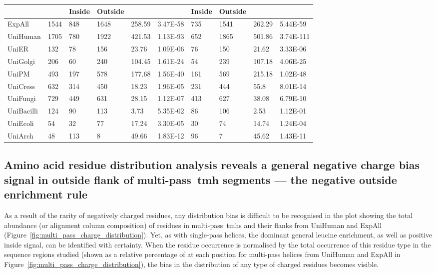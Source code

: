 \begin{table}[htbp!]
{\begin{tabular}{p{5em}lllllllll}
 \cmidrule{3-4}\cmidrule{7-8}    \multicolumn{1}{c}{} &       & \multicolumn{1}{p{5em}}{\textbf{Inside}} & \multicolumn{1}{p{5em}}{\textbf{Outside}} &       &       & \multicolumn{1}{p{5em}}{\textbf{Inside}} & \multicolumn{1}{p{5em}}{\textbf{Outside}} &       &  \\
     \midrule
     ExpAll & 1544  & 848   & 1648  & 258.59 & 3.47E-58 & 735   & 1541  & 262.29 & 5.44E-59 \\
     \midrule
     UniHuman & 1705  & 780   & 1922  & 421.53 & 1.13E-93 & 652   & 1865  & 501.86 & 3.74E-111 \\
     \midrule
     UniER & 132   & 78    & 156   & 23.76 & 1.09E-06 & 76    & 150   & 21.62 & 3.33E-06 \\
     \midrule
     UniGolgi & 206   & 60    & 240   & 104.45 & 1.61E-24 & 54    & 239   & 107.18 & 4.06E-25 \\
     \midrule
     UniPM & 493   & 197   & 578   & 177.68 & 1.56E-40 & 161   & 569   & 215.18 & 1.02E-48 \\
     \midrule
     UniCress & 632   & 314   & 450   & 18.23 & 1.96E-05 & 231   & 444   & 55.8  & 8.01E-14 \\
     \midrule
     UniFungi & 729   & 449   & 631   & 28.15 & 1.12E-07 & 413   & 627   & 38.08 & 6.79E-10 \\
     \midrule
     UniBacilli & 124   & 90    & 113   & 3.73  & 5.35E-02 & 86    & 106   & 2.53  & 1.12E-01 \\
     \midrule
     UniEcoli & 54    & 32    & 77    & 17.24 & 3.30E-05 & 30    & 74    & 14.74 & 1.24E-04 \\
     \midrule
     UniArch & 48    & 113   & 8     & 49.66 & 1.83E-12 & 96    & 7     & 45.62 & 1.43E-11 \\
     \bottomrule
     \end{tabular}}%
     \label{table:negativeskewsinglepass}

    \end{table}%

\subsection{Amino acid residue distribution analysis reveals a general negative charge bias signal in outside flank of multi-pass~\gls{tmh} segments --- the negative outside enrichment rule}

As a result of the rarity of negatively charged residues, any distribution bias is difficult to be recognised in the plot showing the total abundance (or alignment column composition) of residues in multi-pass~\gls{tmh}s and their flanks from UniHuman and ExpAll (Figure~\ref{fig:multi_pass_charge_distribution}).
Yet, as with single-pass helices, the dominant general leucine enrichment, as well as positive inside signal, can be identified with certainty.
When the residue occurrence is normalised by the total occurrence of this residue type in the sequence regions studied (shown as a relative percentage of at each position for multi-pass helices from UniHuman and ExpAll  in Figure~\ref{fig:multi_pass_charge_distribution}), the bias in the distribution of any type of charged residues becomes visible.

